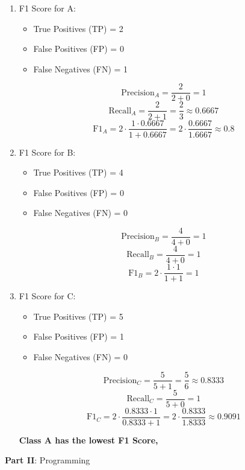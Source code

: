 \documentclass{article}
\begin{document}
\begin{enumerate}[leftmargin=\labelsep]
\begin{enumerate}[label=\alph*.]

\item F1 Score for A:

\begin{itemize}
    \item True Positives (TP) = 2
    \item False Positives (FP) = 0
    \item False Negatives (FN) = 1
\end{itemize}

\[
\text{Precision}_A = \frac{2}{2 + 0} = 1
\]
\[
\text{Recall}_A = \frac{2}{2 + 1} = \frac{2}{3} \approx 0.6667
\]
\[
\text{F1}_A = 2 \cdot \frac{1 \cdot 0.6667}{1 + 0.6667} = 2 \cdot \frac{0.6667}{1.6667} \approx 0.8
\]

\item F1 Score for B:

\begin{itemize}
    \item True Positives (TP) = 4
    \item False Positives (FP) = 0
    \item False Negatives (FN) = 0
\end{itemize}

\[
\text{Precision}_B = \frac{4}{4 + 0} = 1
\]
\[
\text{Recall}_B = \frac{4}{4 + 0} = 1
\]
\[
\text{F1}_B = 2 \cdot \frac{1 \cdot 1}{1 + 1} = 1
\]

\item F1 Score for C:

\begin{itemize}
    \item True Positives (TP) = 5
    \item False Positives (FP) = 1
    \item False Negatives (FN) = 0
\end{itemize}

\[
\text{Precision}_C = \frac{5}{5 + 1} = \frac{5}{6} \approx 0.8333
\]
\[
\text{Recall}_C = \frac{5}{5 + 0} = 1
\]
\[
\text{F1}_C = 2 \cdot \frac{0.8333 \cdot 1}{0.8333 + 1} = 2 \cdot \frac{0.8333}{1.8333} \approx 0.9091
\]

\textbf{Class A has the lowest F1 Score,}
\end{enumerate}

\large{\textbf{Part II}: Programming}\normalsize


\end{enumerate}
\end{document}
